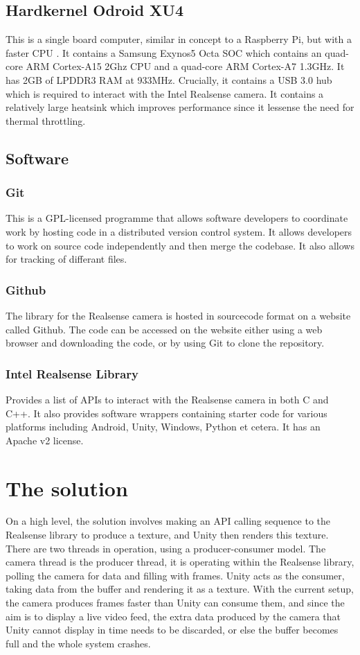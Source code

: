         \subsection{Hardkernel Odroid XU4}
        This is a single board computer, similar in concept to a Raspberry Pi, but with a faster CPU \cite{odroid_xu4}. It contains a Samsung Exynos5 Octa SOC which contains an quad-core ARM Cortex-A15 2Ghz CPU and a quad-core ARM Cortex-A7 1.3GHz. It has 2GB of LPDDR3 RAM at 933MHz. Crucially, it contains a USB 3.0 hub which is required to interact with the Intel Realsense camera. It contains a relatively large heatsink which improves performance since it lessense the need for thermal throttling.
    
    \subsection{Software}
        \subsubsection{Git}
        This is a GPL-licensed programme that allows software developers to coordinate work by hosting code in a distributed version control system. It allows developers to work on source code independently and then merge the codebase. It also allows for tracking of differant files.
        \subsubsection{Github}
        The library for the Realsense camera is hosted in sourcecode format on a website called Github. The code can be accessed on the website either using a web browser and downloading the code, or by using Git to clone the repository.
        \subsubsection{Intel Realsense Library}
        Provides a list of APIs to interact with the Realsense camera in both C and C++. It also provides software wrappers containing starter code for various platforms including Android, Unity, Windows, Python et cetera. It has an Apache v2 license.
        

\section{The solution}
    On a high level, the solution involves making an API calling sequence to the Realsense library to produce a texture, and Unity then renders this texture. There are two threads in operation, using a producer-consumer model. The camera thread is the producer thread, it is operating within the Realsense library, polling the camera for data and filling with frames. Unity acts as the consumer, taking data from the buffer and rendering it as a texture. With the current setup, the camera produces frames faster than Unity can consume them, and since the aim is to display a live video feed, the extra data produced by the camera that Unity cannot display in time needs to be discarded, or else the buffer becomes full and the whole system crashes.

